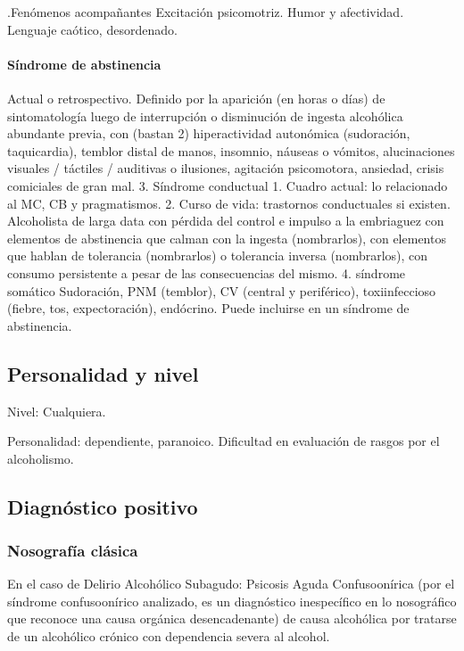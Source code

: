 .Fenómenos acompañantes
Excitación psicomotriz. Humor y afectividad. Lenguaje caótico, desordenado.

\paragraph{Síndrome de abstinencia}
Actual o retrospectivo. Definido por la aparición (en horas o días) de sintomatología luego de interrupción o disminución de ingesta alcohólica abundante previa, con (bastan 2) hiperactividad autonómica (sudoración, taquicardia), temblor distal de manos, insomnio, náuseas o vómitos, alucinaciones visuales / táctiles / auditivas o ilusiones, agitación psicomotora, ansiedad, crisis comiciales de gran mal. 3. Síndrome conductual 1. Cuadro actual: lo relacionado al MC, CB y pragmatismos. 2. Curso de vida: trastornos conductuales si existen. Alcoholista de larga data con pérdida del control e impulso a la embriaguez con elementos de abstinencia que calman con la ingesta (nombrarlos), con elementos que hablan de tolerancia (nombrarlos) o tolerancia inversa (nombrarlos), con consumo persistente a pesar de las consecuencias del mismo. 4. síndrome somático Sudoración, PNM (temblor), CV (central y periférico), toxiinfeccioso (fiebre, tos, expectoración), endócrino. Puede incluirse en un síndrome de abstinencia.

\subsection*{Personalidad y nivel}
Nivel: Cualquiera.

Personalidad: dependiente, paranoico. Dificultad en evaluación de rasgos por el alcoholismo.
\subsection*{Diagnóstico positivo}
\subsubsection*{Nosografía clásica}
En el caso de Delirio Alcohólico Subagudo: Psicosis \faArrowRight Aguda \faArrowRight Confuso\-onírica (por el síndrome confuso\-onírico analizado, es un diagnóstico inespecífico en lo nosográfico que reconoce una causa orgánica desencadenante) \faArrowRight de causa alcohólica por tratarse de un alcohólico crónico con dependencia severa al alcohol.

